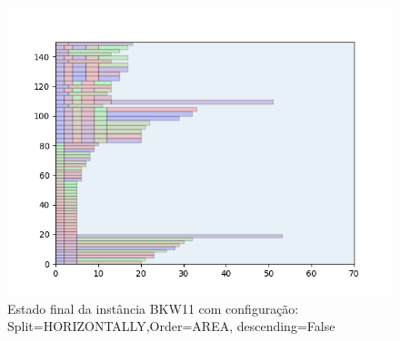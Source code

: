 \begin{figure}[H]
    \centering
    \caption[]{Estado final da instância BKW11 com configuração: Split=HORIZONTALLY,Order=AREA, descending=False}
    \label{fig:bkw11-horizontally-area-false}
    \includegraphics[scale=0.5]{output/figures/bkw/bkw11/horizontally/area/false/000}
\end{figure}